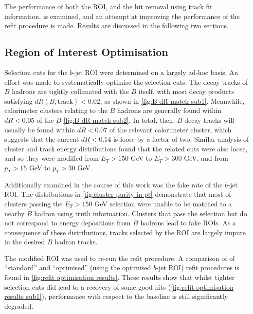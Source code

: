 The performance of both the ROI, and the hit removal using track fit information, is examined, and an attempt at improving the performance of the refit procedure is made. Results are discussed in the following two sections.

\subsection{Region of Interest Optimisation}\label{sec:roi opt}

Selection cuts for the $b$-jet ROI were determined on a largely ad-hoc basis. An effort was made to systematically optimise the selection cuts. The decay tracks of $B$ hadrons are tightly collimated with the $B$ itself, with most decay products satisfying $dR(B, \text{track}) < 0.02$, as shown in \cref{fig:B dR match sub1}. Meanwhile, calorimeter clusters relating to the $B$ hadrons are generally found within $dR < 0.05$ of the $B$ \cref{fig:B dR match sub2}. In total, then, $B$ decay tracks will usually be found within $dR<0.07$ of the relevant calorimeter cluster, which suggests that the current $dR<0.14$ is loose by a factor of two. Similar analysis of cluster and track energy distributions found that the related cuts were also loose, and so they were modified from $E_T > 150$ GeV to $E_T > 300$ GeV, and from $p_T > 15$ GeV to $p_T > 30$ GeV. 

Additionally examined in the course of this work was the fake rate of the $b$-jet ROI. The distributions in \cref{fig:cluster purity in pt} demonstrate that most of clusters passing the $E_T > 150$ GeV selection were unable to be matched to a nearby $B$ hadron using truth information. Clusters that pass the selection but do not correspond to energy depositions from $B$ hadrons lead to fake ROIs. As a consequence of these distributions, tracks selected by the ROI are largely impure in the desired $B$ hadron tracks.

The modified ROI was used to re-run the refit procedure. A comparison of of ``standard'' and ``optimised'' (using the optimised $b$-jet ROI) refit procedures is found in \cref{fig:refit optimisation results}. These results show that whilst tighter selection cuts did lead to a recovery of some good hits (\cref{fig:refit optimisation results sub1}), performance with respect to the baseline is still significantly degraded. 

